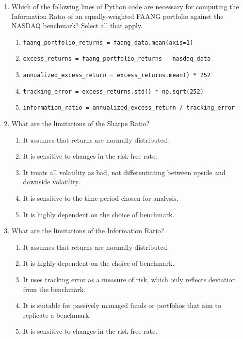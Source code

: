 \documentclass{article}
\begin{document}
\begin{enumerate}
    \item Which of the following lines of Python code are necessary for computing the Information Ratio of an equally-weighted FAANG portfolio against the NASDAQ benchmark? Select all that apply.
    
    \begin{enumerate}
        \item \texttt{faang\_portfolio\_returns = faang\_data.mean(axis=1)}
        \item \texttt{excess\_returns = faang\_portfolio\_returns - nasdaq\_data}
        \item \texttt{annualized\_excess\_return = excess\_returns.mean() * 252}
        \item \texttt{tracking\_error = excess\_returns.std() * np.sqrt(252)}
        \item \texttt{information\_ratio = annualized\_excess\_return / tracking\_error}
    \end{enumerate}

    \item What are the limitations of the Sharpe Ratio?
    \begin{enumerate}
        \item It assumes that returns are normally distributed.
        \item It is sensitive to changes in the risk-free rate.
        \item It treats all volatility as bad, not differentiating between upside and downside volatility.
        \item It is sensitive to the time period chosen for analysis.
        \item It is highly dependent on the choice of benchmark.
    \end{enumerate}

    \item What are the limitations of the Information Ratio?
    \begin{enumerate}
        \item It assumes that returns are normally distributed.
        \item It is highly dependent on the choice of benchmark.
        \item It uses tracking error as a measure of risk, which only reflects deviation from the benchmark.
        \item It is suitable for passively managed funds or portfolios that aim to replicate a benchmark.
        \item It is sensitive to changes in the risk-free rate.
    \end{enumerate}

\end{enumerate}
\end{document}
